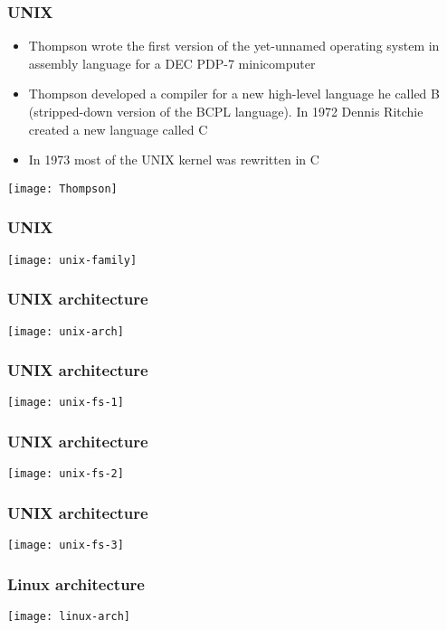 \begin{frame}[plain]
	\frametitle{UNIX}
	

		\begin{itemize}
		\item Thompson wrote the first version of the yet-unnamed operating
		system in assembly language for a DEC PDP-7 minicomputer
		\item  Thompson developed a compiler for a new high-level language
		he called B (stripped-down version of the BCPL language).  
		In 1972 Dennis Ritchie created a new language called C
		\item In 1973 most of the UNIX kernel was
		rewritten in C
						
		\end{itemize}
			\centering
			\texttt{[image: Thompson]}
	
\end{frame}

\begin{frame}[plain]
	\frametitle{UNIX}
	
	\centering
	\texttt{[image: unix-family]}
	
\end{frame}


\begin{frame}[plain]
	\frametitle{UNIX architecture}
	
	\centering
	\texttt{[image: unix-arch]}
	
\end{frame}

\begin{frame}[plain]
	\frametitle{UNIX architecture}
	
	\centering
	\texttt{[image: unix-fs-1]}
	
\end{frame}

\begin{frame}[plain]
	\frametitle{UNIX architecture}
	
	\centering
	\texttt{[image: unix-fs-2]}
	
\end{frame}

\begin{frame}[plain]
	\frametitle{UNIX architecture}
	
	\centering
	\texttt{[image: unix-fs-3]}
	
\end{frame}


\begin{frame}[plain]
	\frametitle{Linux architecture}
	
	\centering
	\texttt{[image: linux-arch]}
	
\end{frame}


